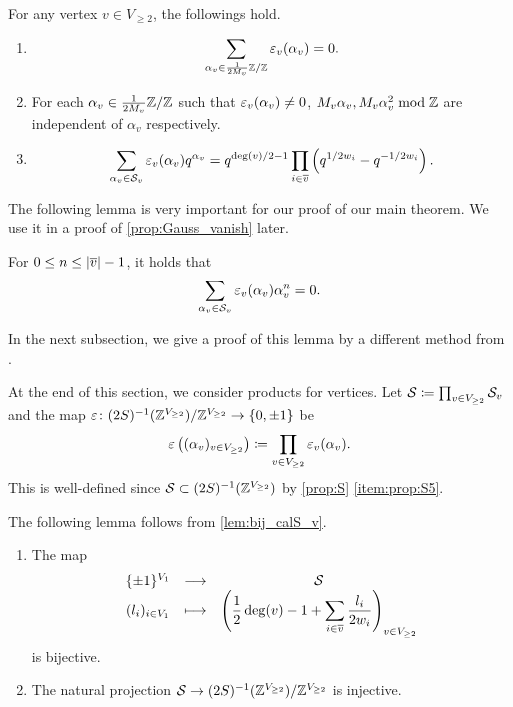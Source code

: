 \documentclass[11pt,a4paper,lualatex]{amsart}
\numberwithin{equation}{section} %
\begin{document}
\begin{lem} \label{lem:epsilon}
	For any vertex $ v \in V_{\ge 2} $, the followings hold.
	\begin{enumerate}
		\item \label{item:lem:epsilon2}
		\[
		\sum_{\alpha_v \in \frac{1}{2 M_v} \mathbb{Z} / \mathbb{Z}} \varepsilon_v (\alpha_v) = 0.
		\]
		\item \label{item:lem:epsilon3}
		For each $ \alpha_v \in \frac{1}{2 M_v} \mathbb{Z} / \mathbb{Z} $ such that $ \varepsilon_v (\alpha_v) \neq 0 $, $ M_v \alpha_v, M_v \alpha_v^2 \bmod \mathbb{Z} $ are independent of $ \alpha_v $ respectively.
		\item \label{item:lem:epsilon4}
		\[
		\sum_{\alpha_{v} \in \mathcal{S}_{v}} \varepsilon_{v}(\alpha_{v}) q^{\alpha_{v}}
		=
		q^{\deg(v)/2 - 1} \prod_{i \in \overline{v}} \left( q^{1 / 2w_{i}} - q^{-1 / 2w_{i}} \right).
		\]
	\end{enumerate}
\end{lem}

The following lemma is very important for our proof of our main theorem.
We use it in a proof of \cref{prop:Gauss_vanish} later.

\begin{lem} \label{lem:FIMT}
	For $ 0 \le n \le \left\lvert\overline{v}\right\rvert - 1 $, it holds that
	\[
	\sum_{\alpha_{v} \in \mathcal{S}_{v}} \varepsilon_{v}(\alpha_{v}) \alpha_v^n
	= 0.
	\]
\end{lem}

In the next subsection, we give a proof of this lemma by a different method from \cite{FIMT}.

At the end of this section, we consider products for vertices.
Let $ \calS \coloneqq \prod_{v \in V_{\ge 2}} \calS_v $ and the map $ \varepsilon \colon (2S)^{-1}(\mathbb{Z}^{V_{\ge 2}}) / \mathbb{Z}^{V_{\ge 2}} \to \{ 0, \pm 1 \} $ be
\[
\veps \left((\alpha_v)_{v \in V_{\ge 2}} \right) \coloneqq \prod_{v \in V_{\ge 2}} \veps_v( \alpha_v).
\]
This is well-defined since $ \mathcal{S} \subset (2S)^{-1}(\mathbb{Z}^{V_{\ge 2}}) $ by \cref{prop:S} \cref{item:prop:S5}.

The following lemma follows from \cref{lem:bij_calS_v}. 

\begin{lem} \label{lem:bij_calS}
	\begin{enumerate}
		\item \label{item:lem:bij_calS1} The map
		\[
		\begin{array}{ccc}
			\{ \pm 1 \}^{V_1} & \longrightarrow & \mathcal{S} \\
			(l_i)_{i \in V_1} & \longmapsto & \displaystyle \left( \frac{1}{2}\deg(v) - 1 + \sum_{i \in \overline{v}} \frac{l_i}{2w_i} \right)_{v \in V_{\ge 2}}
		\end{array}
		\]
		is bijective.
		\item \label{item:lem:bij_calS1}
		The natural projection $ \mathcal{S} \to (2S)^{-1}(\mathbb{Z}^{V_{\ge 2}}) / \mathbb{Z}^{V_{\ge 2}} $ is injective. 
	\end{enumerate}
\end{lem}
\end{document}

